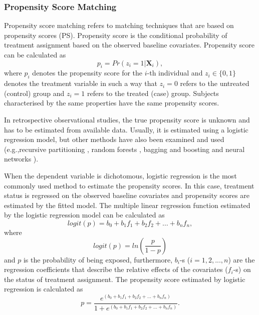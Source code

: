 \subsubsection{Propensity Score Matching}
\label{sec:psm}

Propensity score matching refers to matching techniques that are based on propensity scores (PS). Propensity score is the conditional probability of treatment assignment based on the observed baseline covariates. Propensity score can be calculated as
\begin{equation}
	\label{eq:ps}
	p_i=Pr(z_i = 1|\textbf{X}_i),
\end{equation}
where $p_i$ denotes the propensity score for the $i$-th individual and $z_i \in \{0, 1\}$ denotes the treatment variable in such a way that $z_i=0$ refers to the untreated (control) group and $z_i=1$ refers to the treated (case) group. Subjects characterised by the same properties have the same propensity scores. 

In retrospective observational studies, the true propensity score is unknown and has to be estimated from available data. Usually, it is estimated using a logistic regression model, but other methods have also been examined and used (e.g.,recursive partitioning \cite{setoguchi2008evaluating}, random forests \cite{zhao2016propensity}, bagging and boosting \cite{mccaffrey2004propensity, lee2010improving} and neural networks \cite{austin2007comparison, cavuto2006propensity}).

When the dependent variable is dichotomous, logistic regression is the most commonly used method to estimate the propensity scores. In this case, treatment status is regressed on the observed baseline covariates and propensity scores are estimated by the fitted model. The multiple linear regression function estimated by the logistic regression model can be calculated as
\begin{equation}
	\label{eq:lr_mod}
	logit(p)=b_0+b_1f_1+b_2f_2+\dots+b_nf_n,
\end{equation}
where
\begin{equation}
	\label{eq:logit}
	logit(p)=ln\left(\frac{p}{1-p}\right)
\end{equation}
and $p$ is the probability of being exposed, furthermore, $b_i$-s ($i=1, 2, ..., n$) are the regression coefficients that describe the relative effects of the covariates ($f_i$-s) on the status of treatment assignment. The propensity score estimated by logistic regression is calculated as
\begin{equation}
	\label{eq:ps2}
	p=\frac{e^{(b_0+b_1f_1+b_2f_2+\dots+b_nf_n)}}{1+e^{(b_0+b_1f_1+b_2f_2+\dots+b_nf_n)}}.
\end{equation}

